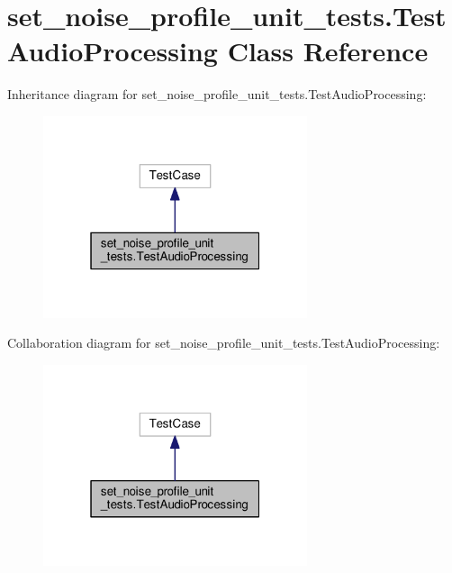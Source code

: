 \hypertarget{classset__noise__profile__unit__tests_1_1TestAudioProcessing}{\section{set\-\_\-noise\-\_\-profile\-\_\-unit\-\_\-tests.\-Test\-Audio\-Processing Class Reference}
\label{classset__noise__profile__unit__tests_1_1TestAudioProcessing}
}


Inheritance diagram for set\-\_\-noise\-\_\-profile\-\_\-unit\-\_\-tests.\-Test\-Audio\-Processing\-:
\nopagebreak
\begin{figure}[H]
\begin{center}
\leavevmode
\includegraphics[width=220pt]{classset__noise__profile__unit__tests_1_1TestAudioProcessing__inherit__graph}
\end{center}
\end{figure}


Collaboration diagram for set\-\_\-noise\-\_\-profile\-\_\-unit\-\_\-tests.\-Test\-Audio\-Processing\-:
\nopagebreak
\begin{figure}[H]
\begin{center}
\leavevmode
\includegraphics[width=220pt]{classset__noise__profile__unit__tests_1_1TestAudioProcessing__coll__graph}
\end{center}
\end{figure}
